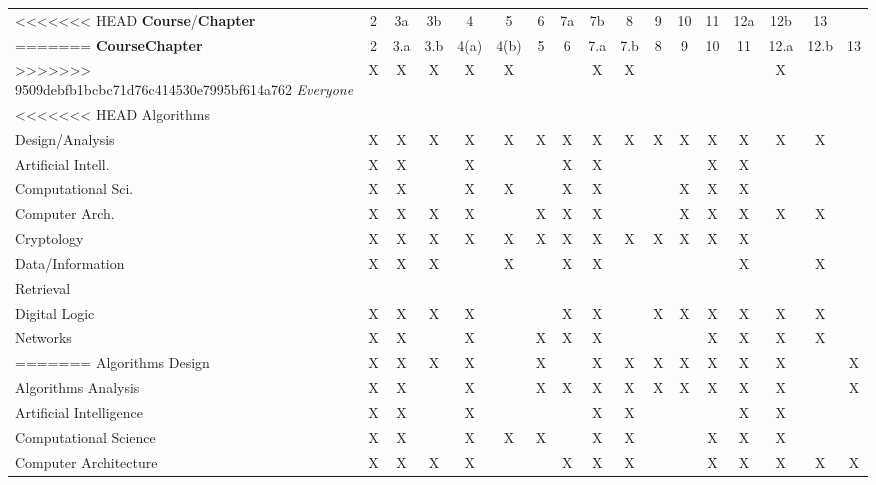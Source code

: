 \documentclass{article}
\begin{document}
\bigskip

{\scriptsize

\noindent
\begin{tabular}{|l||c|c|c|c|c|c|c|c|c|c|c|c|c|c|c|c|}
\hline
<<<<<<< HEAD
{\bf Course}/{\bf Chapter}
   & 2 & 3a & 3b & 4 & 5 & 6 & 7a & 7b & 8 & 9 & 10 & 11 & 12a & 12b & 13 \\
=======
{\bf Course}{\bf Chapter}
   & 2 & 3.a & 3.b & 4(a) & 4(b) & 5 & 6 & 7.a & 7.b & 8 & 9 & 10 & 11 & 12.a & 12.b & 13 \\
>>>>>>> 9509debfb1bcbc71d76c414530e7995bf614a762
\hline
\hline
{\em Everyone} 
   & X & X & X & X & X & &  & X & X &  &  &  &  & X & &  \\
\hline
<<<<<<< HEAD
Algorithms  &  &  &  &  &  &  &  &  &  &  & &  &  & & \\
\hspace*{.1in}Design/Analysis
   & X & X & X & X & X & X & X & X & X & X & X & X & X & X & X \\
   \hline
Artificial Intell.
   & X & X & & X &  &  & X & X &  &  &  & X & X & &  \\
   \hline
Computational Sci.
   & X & X & & X & X &  & X & X &  &  & X & X & X &  &  \\
\hline
Computer Arch. 
   & X & X & X & X &  & X & X & X &  &  & X & X & X & X & X \\
\hline
Cryptology 
   & X & X & X & X & X & X & X & X & X & X & X & X & X & &  \\
\hline
Data/Information 
   & X & X & X & & X &  & X & X &  &  &  &  & X & & X \\
\hspace*{.1in}Retrieval
    &  &  &  &  &  &  &  &  &  &  & &  &  & & \\
\hline
Digital Logic 
   & X & X & X & X &  &  & X & X &  & X & X & X & X & X & X \\
\hline
Networks
   & X & X & & X &  & X & X & X &  &  &  & X & X & X & X \\
=======
Algorithms Design
   & X & X & X & X & & X &  & X & X & X & X & X & X & X & & X \\
\hline
Algorithms Analysis
   & X & X & & X & & X & X & X & X & X & X & X & X & X & & X \\
   \hline
Artificial Intelligence
   & X & X & & X &  & &  & X & X &  &  &  & X & X & &  \\
   \hline
Computational Science
   & X & X & & X & X & X &  & X & X &  &  & X & X & X &  &  \\
\hline
Computer Architecture 
   & X & X & X & X &  &  & X & X & X &  &  & X & X & X & X & X \\

\end{tabular}}
\end{document}
